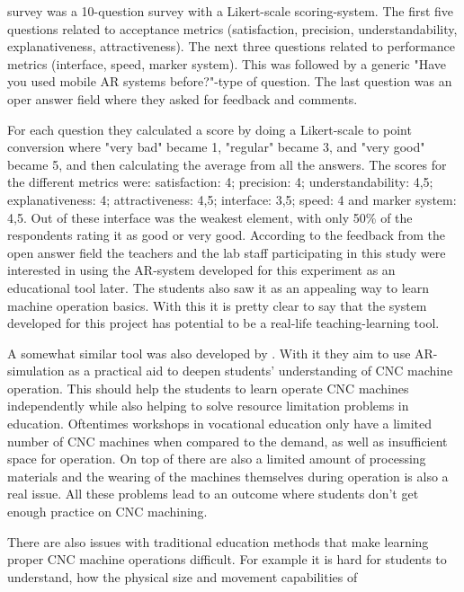 survey was a 10-question survey with a Likert-scale scoring-system. The first 
five questions related to acceptance metrics (satisfaction, precision, 
understandability, explanativeness, attractiveness). The next three questions 
related to performance metrics (interface, speed, marker system). This was 
followed by a generic "Have you used mobile AR systems before?"-type of 
question. The last question was an oper answer field where they asked for 
feedback and comments.\cite{reyesEtAl2016}\par
	For each question they calculated a score by doing a Likert-scale to 
point conversion where "very bad" became 1, "regular" became 3, and "very 
good" became 5, and then calculating the average from all the answers. The 
scores for the different metrics were: satisfaction: 4; precision: 4; 
understandability: 4,5; explanativeness: 4; attractiveness: 4,5; interface: 
3,5; speed: 4 and marker system: 4,5. Out of these interface was the weakest 
element, with only 50\% of the respondents rating it as good or very 
good.\cite{reyesEtAl2016} According to the feedback from the open answer 
field the teachers and the lab staff participating in this study were 
interested in using the AR-system developed for this experiment as an 
educational tool later. The students also saw it as an appealing way to learn 
machine operation basics.\cite{reyesEtAl2016} With this it is pretty clear to 
say that the system developed for this project has potential to be a 
real-life teaching-learning tool.\par
	A somewhat similar tool was also developed by 
\textcite{LinAndLee2020}. With it they aim to use AR-simulation as a 
practical aid to deepen students' understanding of CNC machine operation. 
This should help the students to learn operate CNC machines independently 
while also helping to solve resource limitation problems in education. 
Oftentimes workshops in vocational education only have a limited number of 
CNC machines when compared to the demand, as well as insufficient space for 
operation. On top of there are also a limited amount of processing materials 
and the wearing of the machines themselves during operation is also a real 
issue.\cite{LinAndLee2020} All these problems lead to an outcome where 
students don't get enough practice on CNC machining.\cite{LinAndLee2020}\par
	There are also issues with traditional education methods that make 
learning proper CNC machine operations difficult. For example it is hard for 
students to understand, how the physical size and movement capabilities of 
